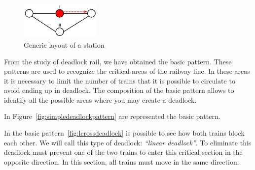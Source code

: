 \documentclass{ewic}
\begin{document}
\begin{figure}[htp]
	\begin{centering}	
	\includegraphics[width=0.35\textwidth, clip]{img/rappresentazione}
	\caption{Generic layout of a station}
	\label{fig:rappresent}
	\end{centering}
\end{figure}


From the study of deadlock rail, we have obtained the basic pattern.
These patterns are used to recognize the critical areas of the railway line. In these areas it is necessary to limit the number of trains that it is possible to circulate to avoid ending up in deadlock.
The composition of the basic pattern allows to identify all the possible areas where you may create a deadlock.

In Figure~\ref{fig:simpledeadlockpattern} are represented the basic pattern.


In the basic pattern~\ref{fig:lcrossdeadlock} is possible to see how both trains block each other. We will call this type of deadlock: \emph{``linear deadlock''}. To eliminate this deadlock must prevent one of the two trains to enter this critical section in the opposite direction. In this section, all trains must move in the same direction.

\end{document}
